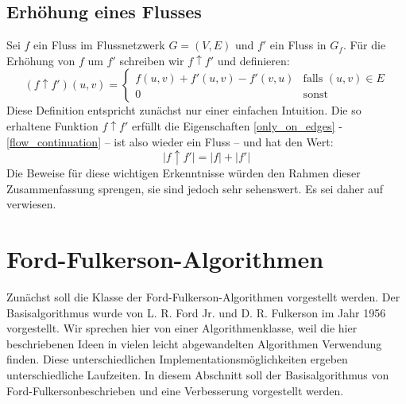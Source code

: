 \documentclass[12pt,a4paper,titlepage,onecolumn,ngerman]{scrartcl}
\theoremstyle{definition}
\theoremstyle{remark}
\newcommand{\ff}{Ford-Fulkerson}
\begin{document}
\subsection{Erhöhung eines Flusses}
Sei $f$ ein Fluss im Flussnetzwerk $G = (V,E)$ und $f'$ ein Fluss in $G_f$.
Für die Erhöhung von $f$ um $f'$ schreiben wir $f \uparrow f'$ und definieren:
\begin{equation}
    (f \uparrow f')(u,v)=
    \begin{cases}
    f(u,v) + f'(u,v) - f'(v,u) & \text{falls $(u,v) \in E$}\\
    0 & \text{sonst}
    \end{cases}
\end{equation}
Diese Definition entspricht zunächst nur einer einfachen Intuition.
\medbreak
Die so erhaltene Funktion $f\uparrow f'$ erfüllt die Eigenschaften \eqref{only_on_edges} - \eqref{flow_continuation} -- ist also wieder ein Fluss -- und hat den Wert:
\begin{equation}\label{flow_incr}
    \lvert f\uparrow f' \rvert = \lvert f \rvert + \lvert f'\rvert
\end{equation}
Die Beweise für diese wichtigen Erkenntnisse würden den Rahmen dieser Zusammenfassung sprengen, sie sind jedoch sehr sehenswert.
Es sei daher auf \cite[][S. 730-732]{Cormen09} verwiesen.


\section{\ff -Algorithmen}
Zunächst soll die Klasse der \ff -Algorithmen vorgestellt werden.
Der Basisalgorithmus wurde von L. R. Ford Jr. und D. R. Fulkerson im Jahr 1956 vorgestellt.
Wir sprechen hier von einer Algorithmenklasse, weil die hier beschriebenen Ideen in vielen leicht abgewandelten Algorithmen Verwendung finden.
Diese unterschiedlichen Implementationsmöglichkeiten ergeben unterschiedliche Laufzeiten.
In diesem Abschnitt soll der Basisalgorithmus von \ff beschrieben und eine Verbesserung vorgestellt werden.
\end{document}
